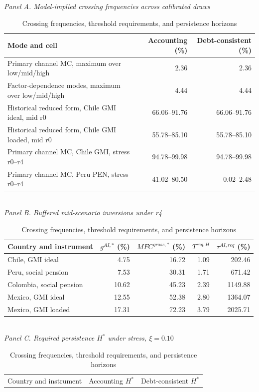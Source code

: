 \begin{table}[H]
\centering
\footnotesize
\begin{singlespace}
\caption{Crossing frequencies, threshold requirements, and persistence horizons}
\label{tab:frequency_threshold_hstar_clean}
\textit{Panel A. Model-implied crossing frequencies across calibrated draws}\\[0.2em]
\begin{tabular}{@{}>{\raggedright\arraybackslash}p{}rr@{}}
\toprule
Mode and cell & Accounting (\%) & Debt-consistent (\%) \\
\midrule
Primary channel MC, maximum over low/mid/high & 2.36 & 2.36 \\
Factor-dependence modes, maximum over low/mid/high & 4.44 & 4.44 \\
Historical reduced form, Chile GMI ideal, mid r0 & 66.06--91.76 & 66.06--91.76 \\
Historical reduced form, Chile GMI loaded, mid r0 & 55.78--85.10 & 55.78--85.10 \\
Primary channel MC, Chile GMI, stress r0--r4 & 94.78--99.98 & 94.78--99.98 \\
Primary channel MC, Peru PEN, stress r0--r4 & 41.02--80.50 & 0.02--2.48 \\
\bottomrule
\end{tabular}
\\[0.7em]\textit{Panel B. Buffered mid-scenario inversions under r4}\\[0.2em]
\begin{tabular}{@{}lrrrr@{}}
\toprule
Country and instrument & $g^{AI,*}$ (\%) & $MFC^{gross,*}$ (\%) & $T^{req,H}$ & $\tau^{AI,req}$ (\%) \\
\midrule
Chile, GMI ideal & 4.75 & 16.72 & 1.09 & 202.46 \\
Peru, social pension & 7.53 & 30.31 & 1.71 & 671.42 \\
Colombia, social pension & 10.62 & 45.23 & 2.39 & 1149.88 \\
Mexico, GMI ideal & 12.55 & 52.38 & 2.80 & 1364.07 \\
Mexico, GMI loaded & 17.31 & 72.23 & 3.79 & 2025.71 \\
\bottomrule
\end{tabular}
\\[0.7em]\textit{Panel C. Required persistence $H^*$ under stress, $\xi=0.10$}\\[0.2em]
\begin{tabular}{@{}>{\raggedright\arraybackslash}p{}rr@{}}
\toprule
Country and instrument & Accounting $H^*$ & Debt-consistent $H^*$ \\

\end{tabular}
\end{singlespace}
\end{table}
